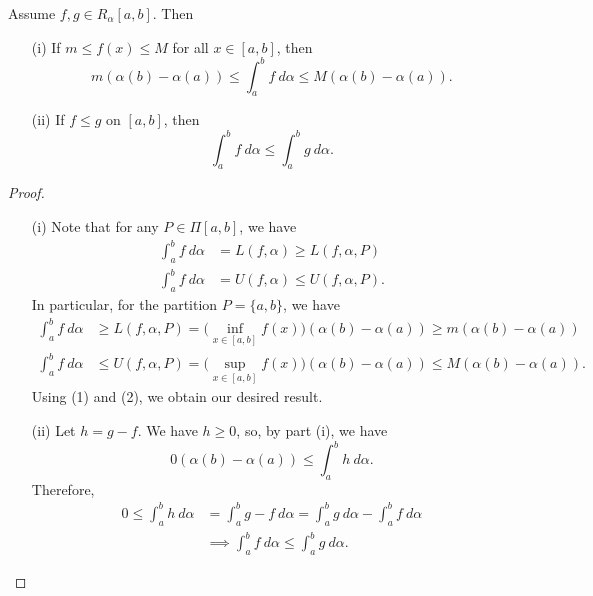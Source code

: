 \begin{theorem}\label{Order properties of R.S integrals} 
    Assume \( f,g \in {R}_{\alpha}[a,b] \). Then
    \begin{enumerate}
        \item[(i)] If \( m \leq f(x) \leq M  \) for all \( x\in [a,b] \), then 
            \[  m (\alpha(b) - \alpha(a)) \leq \int_{ a }^{ b }  f  \ d \alpha \leq M(\alpha(b) - \alpha(a)). \]
        \item[(ii)] If \( f \leq g  \) on \( [a,b] \), then
            \[  \int_{ a }^{ b }  f  \ d \alpha \leq \int_{ a }^{ b } g   \ d \alpha. \]
    \end{enumerate}
\end{theorem}
\begin{proof}
\begin{enumerate}
    \item[(i)] Note that for any \( P \in \Pi[a,b] \), we have 
        \begin{align*}
            \int_{ a }^{ b }  f  \ d \alpha &= L(f,\alpha) \geq L(f,\alpha,P) \\
            \int_{ a }^{ b }  f \ d \alpha &= U(f,\alpha) \leq U(f,\alpha,P).
        \end{align*}
        In particular, for the partition \( P = \{ a,b \}  \), we have 
        \begin{align*}
            \int_{ a }^{ b }  f  \ d \alpha &\geq L(f,\alpha, P) = \Big(  \inf_{x \in [a,b]} f(x) \Big) (\alpha(b) - \alpha(a)) \geq m (\alpha(b) - \alpha(a)) \tag{1} \\
            \int_{ a }^{ b }  f  \ d \alpha &\leq U(f,\alpha,P) = \Big(  \sup_{x \in [a,b]} f(x) \Big) (\alpha(b) - \alpha(a)) \leq M (\alpha(b) - \alpha(a)). \tag{2}
        \end{align*}
        Using (1) and (2), we obtain our desired result.
    \item[(ii)] Let \( h = g - f  \). We have \( h \geq 0  \), so, by part (i), we have
        \[  0 (\alpha(b) - \alpha(a)) \leq \int_{ a }^{ b }  h  \ d \alpha. \]
        Therefore, 
        \begin{align*}
            0 \leq \int_{ a }^{ b } h \ d \alpha &= \int_{ a }^{ b } g - f  \ d \alpha = \int_{ a }^{ b }  g  \ d \alpha - \int_{ a }^{ b }  f  \ d \alpha \\
                                                 &\implies \int_{ a }^{ b } f  \ d \alpha \leq \int_{ a }^{ b }  g  \ d \alpha.
        \end{align*}
\end{enumerate}
\end{proof}

